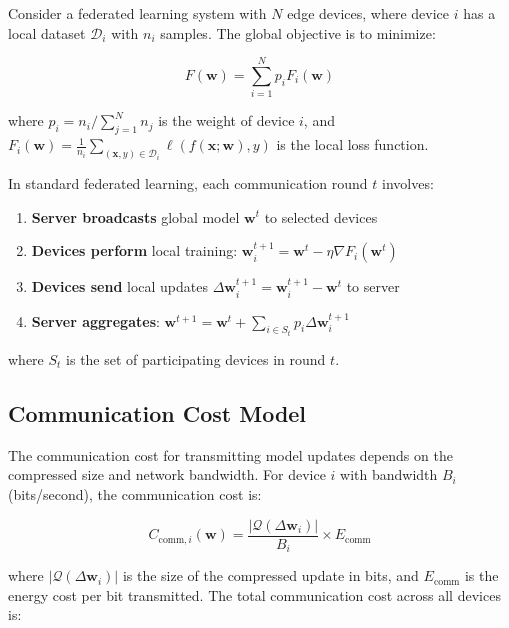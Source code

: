 \documentclass[journal]{IEEEtran}
\begin{document}
Consider a federated learning system with $N$ edge devices, where device $i$ has a local dataset $\mathcal{D}_i$ with $n_i$ samples. The global objective is to minimize:

\begin{equation}
F(\mathbf{w}) = \sum_{i=1}^{N} p_i F_i(\mathbf{w})
\label{eq:global_objective}
\end{equation}

where $p_i = n_i / \sum_{j=1}^{N} n_j$ is the weight of device $i$, and $F_i(\mathbf{w}) = \frac{1}{n_i} \sum_{(\mathbf{x}, y) \in \mathcal{D}_i} \ell(f(\mathbf{x}; \mathbf{w}), y)$ is the local loss function.

In standard federated learning, each communication round $t$ involves:
\begin{enumerate}
    \item \textbf{Server broadcasts} global model $\mathbf{w}^t$ to selected devices
    \item \textbf{Devices perform} local training: $\mathbf{w}_i^{t+1} = \mathbf{w}^t - \eta \nabla F_i(\mathbf{w}^t)$
    \item \textbf{Devices send} local updates $\Delta\mathbf{w}_i^{t+1} = \mathbf{w}_i^{t+1} - \mathbf{w}^t$ to server
    \item \textbf{Server aggregates}: $\mathbf{w}^{t+1} = \mathbf{w}^t + \sum_{i \in S_t} p_i \Delta\mathbf{w}_i^{t+1}$
\end{enumerate}

where $S_t$ is the set of participating devices in round $t$.

\subsection{Communication Cost Model}

The communication cost for transmitting model updates depends on the compressed size and network bandwidth. For device $i$ with bandwidth $B_i$ (bits/second), the communication cost is:

\begin{equation}
C_{\text{comm},i}(\mathbf{w}) = \frac{|\mathcal{Q}(\Delta\mathbf{w}_i)|}{B_i} \times E_{\text{comm}}
\label{eq:comm_cost}
\end{equation}

where $|\mathcal{Q}(\Delta\mathbf{w}_i)|$ is the size of the compressed update in bits, and $E_{\text{comm}}$ is the energy cost per bit transmitted. The total communication cost across all devices is:
\end{document}
